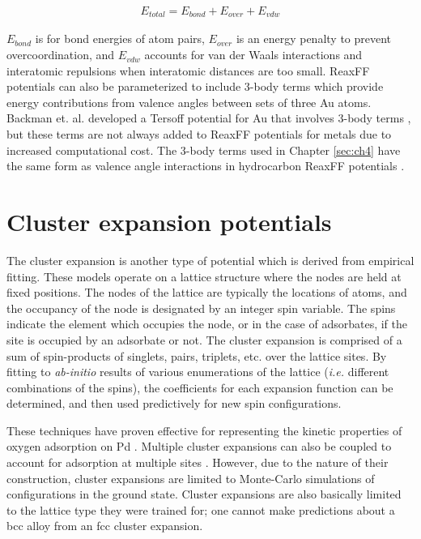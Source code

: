 \documentclass[12pt]{cmuthesis}
\begin{document}
\begin{eqnarray}
E_{total} = E_{bond} + E_{over} + E_{vdw} \label{eqn-base-reax}
\end{eqnarray}

\(E_{bond}\) is for bond energies of atom pairs, \(E_{over}\) is an energy penalty to prevent overcoordination, and \(E_{vdw}\) accounts for van der Waals interactions and interatomic repulsions when interatomic distances are too small. ReaxFF potentials can also be parameterized to include 3-body terms which provide energy contributions from valence angles between sets of three Au atoms. Backman et. al. developed a Tersoff potential for Au that involves 3-body terms \cite{backman-2012-bond}, but these terms are not always added to ReaxFF potentials for metals due to increased computational cost. The 3-body terms used in Chapter \ref{sec:ch4} have the same form as valence angle interactions in hydrocarbon ReaxFF potentials \cite{nielson-2005-devel-reaxf}.

\section{Cluster expansion potentials}
\label{sec:orge281885}
The cluster expansion \cite{sanchez-1984-gener-clust,shi-2007-first-princ,miller-2013-simul-temper} is another type of potential which is derived from empirical fitting. These models operate on a lattice structure where the nodes are held at fixed positions. The nodes of the lattice are typically the locations of atoms, and the occupancy of the node is designated by an integer spin variable. The spins indicate the element which occupies the node, or in the case of adsorbates, if the site is occupied by an adsorbate or not. The cluster expansion is comprised of a sum of spin-products of singlets, pairs, triplets, etc. over the lattice sites. By fitting to \emph{ab-initio} results of various enumerations of the lattice (\emph{i.e.} different combinations of the spins), the coefficients for each expansion function can be determined, and then used predictively for new spin configurations.

These techniques have proven effective for representing the kinetic properties of oxygen adsorption on Pd \cite{frey-2014-implic-cover}. Multiple cluster expansions can also be coupled to account for adsorption at multiple sites \cite{han-2005-surfac-segreg,chen-2011-order-oxygen}. However, due to the nature of their construction, cluster expansions are limited to Monte-Carlo simulations of configurations in the ground state. Cluster expansions are also basically limited to the lattice type they were trained for; one cannot make predictions about a bcc alloy from an fcc cluster expansion.
\end{document}
